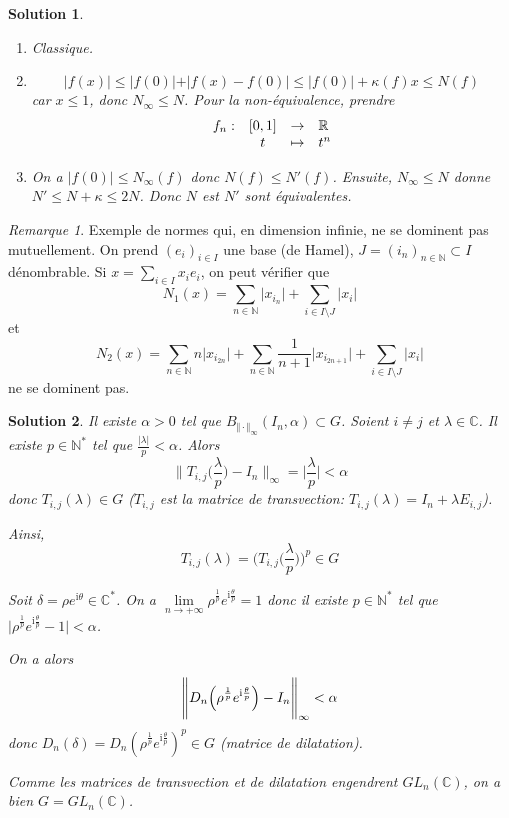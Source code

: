 \documentclass[12pt]{article}
\newtheorem{solution}{Solution}[section]
\theoremstyle{remark}
\newtheorem{remark}{Remarque}
\newcommand{\C}{\mathbb{C}} \newcommand{\Q}{\mathbb{Q}}
\newcommand{\N}{\mathbb{N}} \newcommand{\Z}{\mathbb{Z}}
\newcommand{\function}[5]{
	$$
	\begin{array}{rccl}
		#1: & #2 & \to & #3 \\
		& #4 & \mapsto & #5
	\end{array}
	$$
}
\begin{document}
\begin{solution}
	\phantom{}
	\begin{enumerate}
		\item Classique.
		\item $$\vert f(x)\vert\leqslant\vert f(0)\vert+\vert f(x)-f(0)\vert\leqslant\vert f(0)\vert+\kappa(f)x\leqslant N(f)$$
		car $x\leqslant 1$, donc $N_{\infty}\leqslant N$. Pour la non-équivalence, prendre \function{f_n}{[0,1]}{\R}{t}{t^n}
		\item On a $\vert f(0)\vert\leqslant N_{\infty}(f)$ donc $N(f)\leqslant N'(f)$. Ensuite, $N_{\infty}\leqslant N$ donne $N'\leqslant N+\kappa\leqslant 2N$. Donc $N$ est $N'$ sont équivalentes.
	\end{enumerate}
\end{solution}

\begin{remark}
	Exemple de normes qui, en dimension infinie, ne se dominent pas mutuellement. On prend $(e_{i})_{i\in I}$ une base (de Hamel), $J=(i_{n})_{n\in\N}\subset I$ dénombrable. Si $x=\sum_{i\in I}x_{i}e_{i}$, on peut vérifier que 
	$$N_{1}(x)=\sum_{n\in\N}\vert x_{i_{n}}\vert+\sum_{i\in I\setminus J}\vert x_{i}\vert$$
	et
	$$N_{2}(x)=\sum_{n\in\N}n\vert x_{i_{2n}}\vert+\sum_{n\in\N}\frac{1}{n+1}\bigl\lvert x_{i_{2n+1}}\bigr\rvert+\sum_{i\in I\setminus J}\vert x_{i}\vert$$
	ne se dominent pas.
\end{remark}

\begin{solution}
	Il existe $\alpha>0$ tel que $B_{\Vert\cdot\Vert_{\infty}}(I_{n},\alpha)\subset G$. Soient $i\neq j$ et $\lambda\in\C$. Il existe $p\in\N^{*}$ tel que $\frac{\vert\lambda\vert}{p}<\alpha$. Alors 
	$$\Biggl\lVert T_{i,j}\Biggl(\frac{\lambda}{p}\Biggr)-I_{n}\Biggr\rVert_{\infty}=\Biggl\lvert\frac{\lambda}{p}\Biggr\rvert<\alpha$$
	donc $T_{i,j}(\lambda)\in G$ ($T_{i,j}$ est la matrice de transvection: $T_{i,j}(\lambda)=I_{n}+\lambda E_{i,j}$).

	Ainsi,
	$$T_{i,j}(\lambda)=\Biggl(T_{i,j}\Biggl(\frac{\lambda}{p}\Biggr)\Biggr)^{p}\in G$$

	Soit $\delta=\rho e^{\mathrm{i}\theta}\in\C^{*}$. On a $\lim\limits_{n\to+\infty}\rho^{\frac{1}{p}}e^{\mathrm{i}\frac{\theta}{p}}=1$ donc il existe $p\in\N^{*}$ tel que $\vert\rho^{\frac{1}{p}}e^{\mathrm{i}\frac{\theta}{p}}-1\vert<\alpha$.
	
	On a alors
	$$\Biggl\lVert D_{n}\Bigl(\rho^{\frac{1}{p}}e^{\mathrm{i}\frac{\theta}{p}}\Bigr)-I_{n}\Biggr\rVert_{\infty}<\alpha$$
	donc $D_{n}(\delta)=D_{n}(\rho^{\frac{1}{p}}e^{\mathrm{i}\frac{\theta}{p}})^{p}\in G$ (matrice de dilatation).

	Comme les matrices de transvection et de dilatation engendrent $GL_{n}(\C)$, on a bien $G=GL_{n}(\C)$.
\end{solution}
\end{document}
